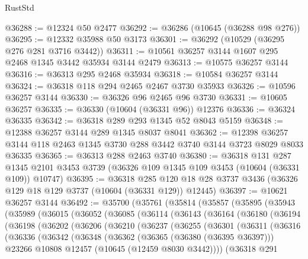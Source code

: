 \begin{lexlean}{RustStd}
\begin{coremodule}
@36288 := @12324 @50 @2477
@36292 := @36286 (@10645 (@36288 @98 @276))
@36295 := @12332 @35988 @50 @3173
@36301 := @36292 (@10529 (@36295 @276 @281 @3716 @3442))
@36311 := @10561 @36257 @3144 @1607 @295 @2468 @1345 @3442 @35934 @3144 @2479
@36313 := @10575 @36257 @3144
@36316 := @36313 @295 @2468 @35934
@36318 := @10584 @36257 @3144
@36324 := @36318 @118 @294 @2465 @2467 @3730 @35933
@36326 := @10596 @36257 @3144
@36330 := @36326 @96 @2465 @96 @3730
@36331 := @10605 @36257
@36335 := @36330 (@10604 (@36331 @96)) @12376
@36336 := @36324 @36335
@36342 := @36318 @289 @293 @1345 @52 @8043 @5159
@36348 := @12388 @36257 @3144 @289 @1345 @8037 @8041
@36362 := @12398 @36257 @3144 @118 @2463 @1345 @3730 @288 @3442 @3740 @3144 @3723 @8029 @8033 @36335
@36365 := @36313 @288 @2463 @3740
@36380 := @36318
    @131
    @287
    @1345
    @2101
    @3453
    @3739
    (@36326 @109 @1345 @109 @3453 (@10604 (@36331 @109)) @10747)
@36395 := @36318
    @285
    @120
    @18
    @28
    @3737
    @3436
    (@36326 @129 @18 @129 @3737 (@10604 (@36331 @129)) @12445)
@36397 := @10621 @36257 @3144
@36492 := @35700
    (@35761
      (@35814
        (@35857
          (@35895
            (@35943
              (@35989
                (@36015
                  (@36052
                    (@36085
                      (@36114
                        (@36143
                          (@36164
                            (@36180
                              (@36194
                                (@36198
                                  (@36202
                                    (@36206
                                      (@36210
                                        (@36237
                                          (@36255
                                            (@36301
                                              (@36311
                                                (@36316
                                                  (@36336
                                                    (@36342
                                                      (@36348
                                                        (@36362
                                                          (@36365 (@36380 (@36395 @36397)))
                                                          @23266
                                                          @10808
                                                          @12457
                                                          (@10645 (@12459 @8030 @3442))))
                                                      (@36318
                                                        @291

\end{coremodule}
\end{lexlean}
